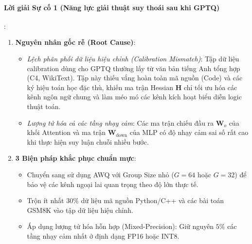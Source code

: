 \paragraph{Lời giải Sự cố 1 (Năng lực giải thuật suy thoái sau khi GPTQ)}:
\begin{enumerate}
  \item \textbf{Nguyên nhân gốc rễ (Root Cause)}:
  \begin{itemize}
    \item \textit{Lệch phân phối dữ liệu hiệu chỉnh (Calibration Mismatch)}: Tập dữ liệu calibration dùng cho GPTQ thường lấy từ văn bản tiếng Anh tổng hợp (C4, WikiText). Tập này thiếu vắng hoàn toàn mã nguồn (Code) và các ký hiệu toán học đặc thù, khiến ma trận Hessian $\mathbf{H}$ chỉ tối ưu hóa các kênh ngôn ngữ chung và làm méo mó các kênh kích hoạt biểu diễn logic thuật toán.
    \item \textit{Lượng tử hóa cả các tầng nhạy cảm}: Các ma trận chiếu đầu ra $\mathbf{W}_o$ của khối Attention và ma trận $\mathbf{W}_{\text{down}}$ của MLP có độ nhạy cảm sai số rất cao khi thực hiện suy luận chuỗi nhiều bước.
  \end{itemize}
  \item \textbf{3 Biện pháp khắc phục chuẩn mực}:
  \begin{itemize}
    \item Chuyển sang sử dụng AWQ với Group Size nhỏ ($G=64$ hoặc $G=32$) để bảo vệ các kênh ngoại lai quan trọng theo độ lớn thực tế.
    \item Trộn ít nhất $30\%$ dữ liệu mã nguồn Python/C++ và các bài toán GSM8K vào tập dữ liệu hiệu chỉnh.
    \item Áp dụng lượng tử hóa hỗn hợp (Mixed-Precision): Giữ nguyên $5\%$ các tầng nhạy cảm nhất ở định dạng FP16 hoặc INT8.
  \end{itemize}
\end{enumerate}

